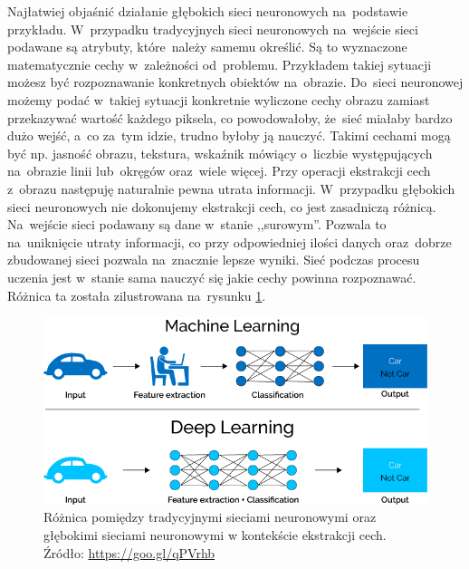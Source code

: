 Najłatwiej objaśnić działanie głębokich sieci neuronowych na~podstawie przykładu. W~przypadku tradycyjnych sieci neuronowych na~wejście sieci podawane są atrybuty, które~należy samemu określić. Są to wyznaczone matematycznie cechy w~zależności od~problemu. Przykładem takiej sytuacji możesz być rozpoznawanie konkretnych obiektów na~obrazie. Do~sieci neuronowej możemy podać w~takiej sytuacji konkretnie wyliczone cechy obrazu zamiast przekazywać wartość każdego piksela, co powodowałoby, że~sieć miałaby bardzo dużo wejść, a~co za~tym idzie, trudno byłoby ją nauczyć. Takimi cechami mogą być np. jasność obrazu, tekstura, wskaźnik mówiący o~liczbie występujących na~obrazie linii lub~okręgów oraz~wiele więcej. Przy operacji ekstrakcji cech z~obrazu następuję naturalnie pewna utrata informacji. W~przypadku głębokich sieci neuronowych nie dokonujemy ekstrakcji cech, co jest zasadniczą różnicą. Na~wejście sieci podawany są dane w~stanie ,,surowym''. Pozwala to na~uniknięcie utraty informacji, co przy odpowiedniej ilości danych oraz~dobrze zbudowanej sieci pozwala na~znacznie lepsze wyniki. Sieć podczas procesu uczenia jest w~stanie sama nauczyć się jakie cechy powinna rozpoznawać. Różnica ta została zilustrowana na~rysunku \ref{dnnDiff}.

\begin{figure}[ht!]
\centering
\includegraphics[scale=0.5]{res/dnn1.png}
\caption[Caption for LOF]{Różnica pomiędzy tradycyjnymi sieciami neuronowymi oraz głębokimi sieciami neuronowymi w kontekście ekstrakcji cech. Źródło: \url{https://goo.gl/qPVrhb}\label{dnnDiff}} 
\end{figure}

